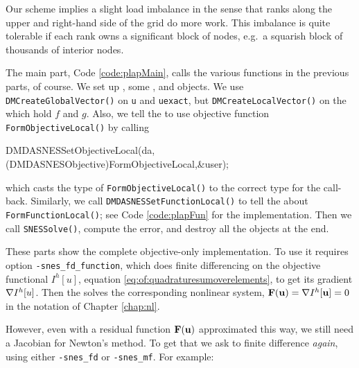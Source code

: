 Our scheme implies a slight load imbalance in the sense that ranks along the upper and right-hand side of the grid do more work.  This imbalance is quite tolerable if each rank owns a significant block of nodes, e.g.~a squarish block of thousands of interior nodes.

The main part, Code \ref{code:plapMain}, calls the various functions in the previous parts, of course.  We set up \pDMDA, some \pVecs, and \pSNES objects.  We use \texttt{DMCreateGlobalVector()} on \texttt{u} and \texttt{uexact}, but \texttt{DMCreateLocalVector()} on the \pVecs which hold $f$ and $g$.  Also, we tell the \pDMDA to use objective function \texttt{FormObjectiveLocal()} by calling
\begin{code}
    DMDASNESSetObjectiveLocal(da,(DMDASNESObjective)FormObjectiveLocal,&user);
\end{code}
which casts the type of \texttt{FormObjectiveLocal()} to the correct type for the call-back.  Similarly, we call \texttt{DMDASNESSetFunctionLocal()} to tell the \pDMDA about \texttt{FormFunctionLocal()}; see Code \ref{code:plapFun} for the implementation.  Then we call \texttt{SNESSolve()}, compute the error, and destroy all the objects at the end.

These parts show the complete objective-only implementation.  To use it requires option \texttt{-snes\_fd\_function}, which does finite differencing on the objective functional $I^h[u]$, equation \eqref{eq:of:quadraturesumoverelements}, to get its gradient $\nabla I^h[u]$.  Then the \pSNES solves the corresponding nonlinear system, $\mathbf{F}(\mathbf{u}) = \nabla I^h[\mathbf{u}] = 0$ in the notation of Chapter \ref{chap:nl}.


However, even with a residual function $\mathbf{F}(\mathbf{u})$ approximated this way, we still need a Jacobian for Newton's method.  To get that we ask \PETSc to finite difference \emph{again}, using either \texttt{-snes\_fd} or \texttt{-snes\_mf}.  For example:

